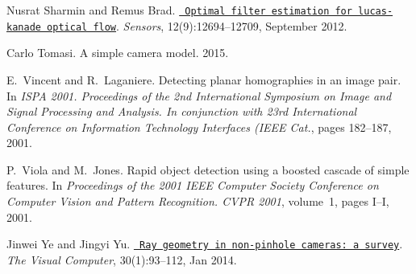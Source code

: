 \begin{DoxyDescription}
\item[\label{citelist_CITEREF_Sharmin12}%
\Hypertarget{citelist_CITEREF_Sharmin12}%
\mbox{[}23\mbox{]}]Nusrat Sharmin and Remus Brad. \href{https://doi.org/10.3390/s120912694}{\texttt{ Optimal filter estimation for lucas-\/kanade optical flow}}. {\itshape Sensors}, 12(9)\+:12694--12709, September 2012. 


\item[\label{citelist_CITEREF_Tomasi15}%
\Hypertarget{citelist_CITEREF_Tomasi15}%
\mbox{[}24\mbox{]}]Carlo Tomasi. A simple camera model. 2015.


\item[\label{citelist_CITEREF_Vin01}%
\Hypertarget{citelist_CITEREF_Vin01}%
\mbox{[}25\mbox{]}]E.~Vincent and R.~Laganiere. Detecting planar homographies in an image pair. In {\itshape ISPA 2001. Proceedings of the 2nd International Symposium on Image and Signal Processing and Analysis. In conjunction with 23rd International Conference on Information Technology Interfaces (IEEE Cat.}, pages 182--187, 2001. 


\item[\label{citelist_CITEREF_viola01}%
\Hypertarget{citelist_CITEREF_viola01}%
\mbox{[}26\mbox{]}]P.~Viola and M.~Jones. Rapid object detection using a boosted cascade of simple features. In {\itshape Proceedings of the 2001 IEEE Computer Society Conference on Computer Vision and Pattern Recognition. CVPR 2001}, volume~1, pages I--I, 2001. 


\item[\label{citelist_CITEREF_Ye2014}%
\Hypertarget{citelist_CITEREF_Ye2014}%
\mbox{[}27\mbox{]}]Jinwei Ye and Jingyi Yu. \href{https://doi.org/10.1007/s00371-013-0786-4}{\texttt{ Ray geometry in non-\/pinhole cameras\+: a survey}}. {\itshape The Visual Computer}, 30(1)\+:93--112, Jan 2014. 


\end{DoxyDescription}